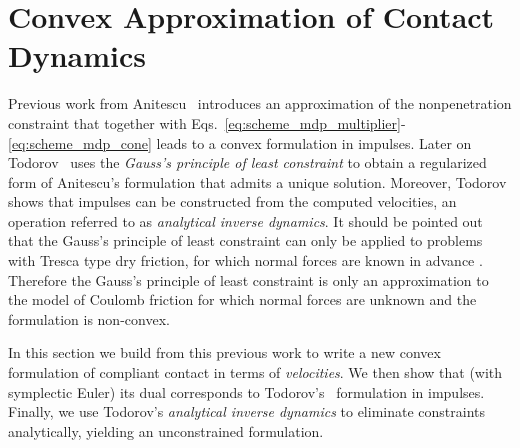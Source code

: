 
\section{Convex Approximation of Contact Dynamics}\label{sec:convex_approximation}

Previous work from Anitescu~\cite{bib:anitescu2006}
introduces an approximation of the nonpenetration constraint that together with
Eqs.~\eqref{eq:scheme_mdp_multiplier}-\eqref{eq:scheme_mdp_cone} leads to a
convex formulation in impulses. Later on Todorov~\cite{bib:todorov2011,
bib:todorov2014} uses the \emph{Gauss's principle of least constraint} to obtain
a regularized form of Anitescu's formulation that admits a unique solution.
Moreover, Todorov shows that impulses can be constructed from the computed
velocities, an operation referred to as \textit{analytical inverse dynamics}. It
should be pointed out that the Gauss's principle of least constraint can only be
applied to problems with Tresca type dry friction, for which normal forces are
known in advance \cite{bib:yunt2014}. Therefore the Gauss's principle of least
constraint is only an approximation to the model of Coulomb friction for which
normal forces are unknown and the formulation is non-convex.

In this section we build from this previous work to write a new convex formulation
of compliant contact in terms of \emph{velocities}.  We then show that (with
symplectic Euler) its dual corresponds to Todorov's~\cite{bib:todorov2014}
formulation in impulses. Finally, we use
Todorov's \textit{analytical inverse dynamics} to eliminate constraints
analytically, yielding an unconstrained formulation.




